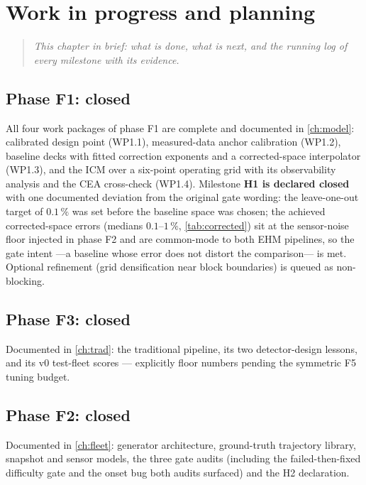 \chapter{Work in progress and planning}
\label{ch:wip}

\begin{quote}\itshape
This chapter in brief: what is done, what is next, and the running log of every milestone with
its evidence.
\end{quote}

\section{Phase F1: closed}

All four work packages of phase F1 are complete and documented in \cref{ch:model}: calibrated
design point (WP1.1), measured-data anchor calibration (WP1.2), baseline decks with fitted
correction exponents and a corrected-space interpolator (WP1.3), and the ICM over a six-point
operating grid with its observability analysis and the CEA cross-check (WP1.4). Milestone
\textbf{H1 is declared closed} with one documented deviation from the original gate wording:
the leave-one-out target of $0.1\,\%$ was set before the baseline space was chosen; the
achieved corrected-space errors (medians $0.1$--$1\,\%$, \cref{tab:corrected}) sit at the
sensor-noise floor injected in phase F2 and are common-mode to both EHM pipelines, so the gate
intent ---a baseline whose error does not distort the comparison--- is met. Optional
refinement (grid densification near block boundaries) is queued as non-blocking.

\section{Phase F3: closed}

Documented in \cref{ch:trad}: the traditional pipeline, its two detector-design lessons, and
its v0 test-fleet scores --- explicitly floor numbers pending the symmetric F5 tuning budget.

\section{Phase F2: closed}

Documented in \cref{ch:fleet}: generator architecture, ground-truth trajectory library,
snapshot and sensor models, the three gate audits (including the failed-then-fixed difficulty
gate and the onset bug both audits surfaced) and the H2 declaration.

